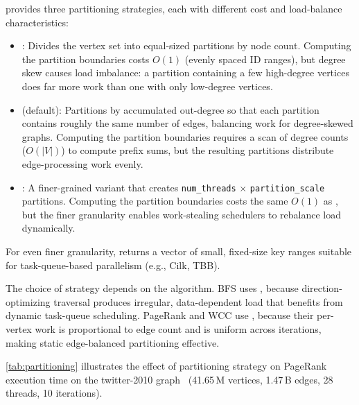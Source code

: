 \project{} provides three partitioning strategies, each with different cost and load-balance characteristics:
\begin{itemize}
  \item {}: Divides the vertex set into equal-sized partitions by node count. Computing the partition boundaries costs $O(1)$ (evenly spaced ID ranges), but degree skew causes load imbalance: a partition containing a few high-degree vertices does far more work than one with only low-degree vertices.

  \item {} (default): Partitions by accumulated out-degree so that each partition contains roughly the same number of edges, balancing work for degree-skewed graphs. Computing the partition boundaries requires a scan of degree counts ($O(|V|)$) to compute prefix sums, but the resulting partitions distribute edge-processing work evenly.

  \item {}: A finer-grained variant that creates \texttt{num\_threads} $\times$ \texttt{partition\_scale} partitions.  Computing the partition boundaries costs the same $O(1)$ as , but the finer granularity enables work-stealing schedulers to rebalance load dynamically.
\end{itemize}

For even finer granularity,  returns a vector of small, fixed-size key ranges suitable for task-queue-based parallelism (e.g., Cilk\cite{openCILK}, TBB\cite{IntelTBB}).

The choice of strategy depends on the algorithm.
\ac{BFS} uses , because direction-optimizing traversal produces irregular, data-dependent load that benefits from dynamic task-queue scheduling.
PageRank and \ac{WCC} use , because their per-vertex work is proportional to edge count and is uniform across iterations, making static edge-balanced partitioning effective.

\autoref{tab:partitioning} illustrates the effect of partitioning strategy on PageRank execution time on the twitter-2010 graph~\cite{twitter2010} (41.65\,M vertices, 1.47\,B edges, 28 threads, 10 iterations).


